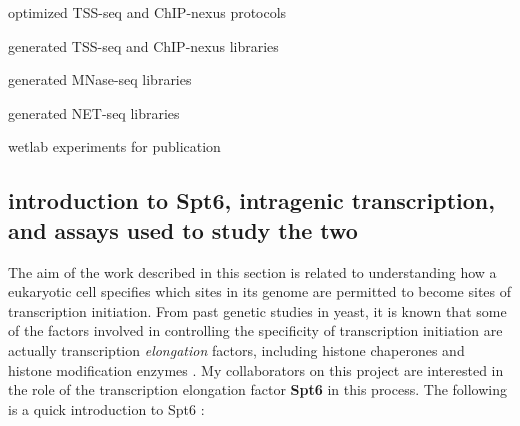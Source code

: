\documentclass[9pt, letterpaper]{article}
\begin{document}
\begin{description}[align=right, labelwidth=5cm, noitemsep]
    \item [Steve Doris] optimized TSS-seq and ChIP-nexus protocols
    \item [] generated TSS-seq and ChIP-nexus libraries
    \item [Olga Viktorovskaya] generated MNase-seq libraries
    \item [Magdalenda Murawska] generated NET-seq libraries
    \item [Dan Spatt] wetlab experiments for publication
\end{description}

\subsection{introduction to Spt6, intragenic transcription, and assays used to study the two}

The aim of the work described in this section is related to understanding how a eukaryotic cell specifies which sites in its genome are permitted to become sites of transcription initiation. From past genetic studies in yeast, it is known that some of the factors involved in controlling the specificity of transcription initiation are actually transcription \textit{elongation} factors, including histone chaperones and histone modification enzymes \cite{kaplan2003, cheung2008, hennig2013}. My collaborators on this project are interested in the role of the transcription elongation factor \textbf{Spt6} in this process. The following is a quick introduction to Spt6 \cite{doris2018}:
\end{document}
